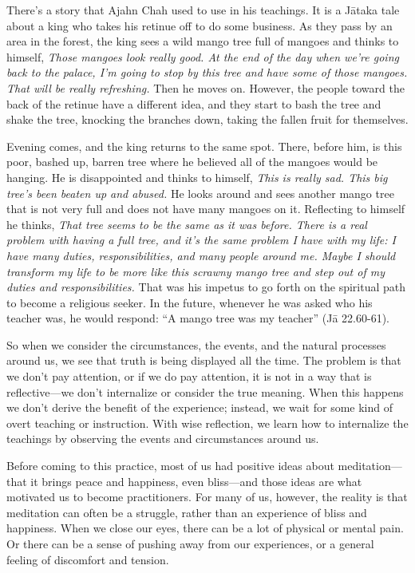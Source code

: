 There's a story that Ajahn Chah used to use in his teachings. It is a 
Jātaka tale about a king who takes his retinue off to do some 
business. As they pass by an area in the forest, the king sees a wild 
mango tree full of mangoes and thinks to himself, \emph{Those mangoes 
look really good. At the end of the day when we're going back to the 
palace, I'm going to stop by this tree and have some of those mangoes. 
That will be really refreshing.} Then he moves on. However, the people 
toward the back of the retinue have a different idea, and they start to 
bash the tree and shake the tree, knocking the branches down, taking 
the fallen fruit for themselves.

Evening comes, and the king returns to the same spot. There, before 
him, is this poor, bashed up, barren tree where he believed all of the 
mangoes would be hanging. He is disappointed and thinks to himself, 
\emph{This is really sad. This big tree's been beaten up and abused.} 
He looks around and sees another mango tree that is not very full and 
does not have many mangoes on it. Reflecting to himself he thinks, 
\emph{That tree seems to be the same as it was before. There is a real 
problem with having a full tree, and it's the same problem I have with 
my life: I have many duties, responsibilities, and many people around 
me. Maybe I should transform my life to be more like this scrawny mango 
tree and step out of my duties and responsibilities.} That was his 
impetus to go forth on the spiritual path to become a religious seeker. 
In the future, whenever he was asked who his teacher was, he would 
respond: ``A mango tree was my teacher'' (Jā 22.60-61).

So when we consider the circumstances, the events, and the natural 
processes around us, we see that truth is being displayed all the time. 
The problem is that we don't pay attention, or if we do pay attention, 
it is not in a way that is reflective---we don't internalize or 
consider the true meaning. When this happens we don't derive the 
benefit of the experience; instead, we wait for some kind of overt 
teaching or instruction. With wise reflection, we learn how to 
internalize the teachings by observing the events and circumstances 
around us.


Before coming to this practice, most of us had positive ideas about 
meditation---that it brings peace and happiness, even bliss---and those 
ideas are what motivated us to become practitioners. For many of us, 
however, the reality is that meditation can often be a struggle, rather 
than an experience of bliss and happiness. When we close our eyes, 
there can be a lot of physical or mental pain. Or there can be a sense 
of pushing away from our experiences, or a general feeling of 
discomfort and tension.

